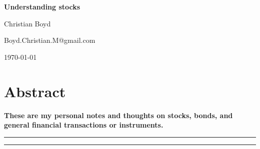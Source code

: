 \begin{center}{\Large \textbf{
Understanding stocks
}}\end{center}

\begin{center}
Christian Boyd
\end{center}

\begin{center}
{\small \sf Boyd.Christian.M@gmail.com}
\end{center}

\begin{center}
\today
\end{center}


\section*{Abstract}
{\bf
These are my personal notes and thoughts on stocks, bonds, and general financial transactions or instruments.
}

\vspace{10pt}
\noindent\rule{\textwidth}{1pt}
\tableofcontents
\noindent\rule{\textwidth}{1pt}
\vspace{10pt}